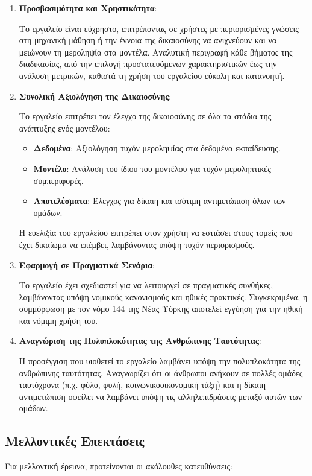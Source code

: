 \documentclass[12pt,twoside]{article}
\begin{document}
\begin{enumerate}
    \item \textbf{Προσβασιμότητα και Χρηστικότητα}:
    
    Το εργαλείο είναι εύχρηστο, επιτρέποντας σε χρήστες με περιορισμένες γνώσεις στη μηχανική μάθηση ή την έννοια της δικαιοσύνης να ανιχνεύουν και να μειώνουν τη μεροληψία στα μοντέλα. Αναλυτική περιγραφή κάθε βήματος της διαδικασίας, από την επιλογή προστατευόμενων χαρακτηριστικών έως την ανάλυση μετρικών, καθιστά τη χρήση του εργαλείου εύκολη και κατανοητή.
    
    \item \textbf{Συνολική Αξιολόγηση της Δικαιοσύνης}:
    
    Το εργαλείο επιτρέπει τον έλεγχο της δικαιοσύνης σε όλα τα στάδια της ανάπτυξης ενός μοντέλου:
    \begin{itemize}
        \item \textbf{Δεδομένα}: Αξιολόγηση τυχόν μεροληψίας στα δεδομένα εκπαίδευσης.
        \item \textbf{Μοντέλο}: Ανάλυση του ίδιου του μοντέλου για τυχόν μεροληπτικές συμπεριφορές.
        \item \textbf{Αποτελέσματα}: Έλεγχος για δίκαιη και ισότιμη αντιμετώπιση όλων των ομάδων.
    \end{itemize}
    Η ευελιξία του εργαλείου επιτρέπει στον χρήστη να εστιάσει στους τομείς που έχει δικαίωμα να επέμβει, λαμβάνοντας υπόψη τυχόν περιορισμούς.
    
    \item \textbf{Εφαρμογή σε Πραγματικά Σενάρια}:
    
    Το εργαλείο έχει σχεδιαστεί για να λειτουργεί σε πραγματικές συνθήκες, λαμβάνοντας υπόψη νομικούς κανονισμούς και ηθικές πρακτικές. Συγκεκριμένα, η συμμόρφωση με τον νόμο 144 της Νέας Υόρκης  αποτελεί εγγύηση για την ηθική και νόμιμη χρήση του.
    
    \item \textbf{Αναγνώριση της Πολυπλοκότητας της Ανθρώπινης Ταυτότητας}:
    
    Η προσέγγιση που υιοθετεί το εργαλείο λαμβάνει υπόψη την πολυπλοκότητα της ανθρώπινης ταυτότητας. Αναγνωρίζει ότι οι άνθρωποι ανήκουν σε πολλές ομάδες ταυτόχρονα (π.χ. φύλο, φυλή, κοινωνικοοικονομική τάξη) και η δίκαιη αντιμετώπιση οφείλει να λαμβάνει υπόψη τις αλληλεπιδράσεις μεταξύ αυτών των ομάδων.
\end{enumerate}

\subsection{Μελλοντικές Επεκτάσεις}
Για μελλοντική έρευνα, προτείνονται οι ακόλουθες κατευθύνσεις:
\end{document}
